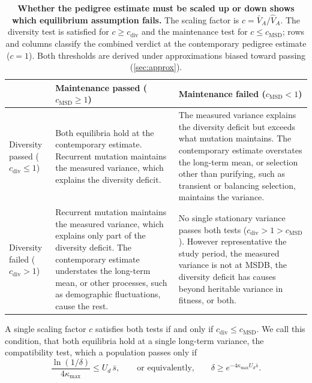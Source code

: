 \documentclass{article}
\begin{document}
\begin{table}[h!]
\centering
\caption{\textbf{Whether the pedigree estimate must be scaled up or down shows which equilibrium assumption fails.} The scaling factor is $c = \bar{V}_A/\hat{V}_A$. The diversity test is satisfied for $c \ge c_\text{div}$ and the maintenance test for $c \le c_\text{MSD}$; rows and columns classify the combined verdict at the contemporary pedigree estimate ($c = 1$). Both thresholds are derived under approximations biased toward passing (\autoref{sec:approx}).}
\label{tab:c}
\begin{tabular}{p{3.0cm}p{5.6cm}p{5.6cm}}
\toprule
& Maintenance passed ($c_\text{MSD} \ge 1$) & Maintenance failed ($c_\text{MSD} < 1$) \\
\midrule
Diversity passed ($c_\text{div} \le 1$) & Both equilibria hold at the contemporary estimate. Recurrent mutation maintains the measured variance, which explains the diversity deficit.& The measured variance explains the diversity deficit but exceeds what mutation maintains. The contemporary estimate overstates the long-term mean, or selection other than purifying, such as transient or balancing selection, maintains the variance.\\
\addlinespace
Diversity failed ($c_\text{div} > 1$) & Recurrent mutation maintains the measured variance, which explains only part of the diversity deficit. The contemporary estimate understates the long-term mean, or other processes, such as demographic fluctuations, cause the rest.& No single stationary variance passes both tests ($c_\text{div} > 1 > c_\text{MSD}$). However representative the study period, the measured variance is not at MSDB, the diversity deficit has causes beyond heritable variance in fitness, or both.\\
\bottomrule
\end{tabular}
\end{table}
A single scaling factor $c$ satisfies both tests if and only if $c_\text{div} \le c_\text{MSD}$. We call this condition, that both equilibria hold at a single long-term variance, the compatibility test, which a population passes only if
\begin{equation}
    \frac{\ln(1/\delta)}{4\kappa_\text{max}} \le U_d\,\bar{s}, \qquad \text{or equivalently,} \qquad \delta \ge e^{-4\kappa_\text{max}U_d\bar{s}}. \label{eq:compat}
\end{equation}
\end{document}
